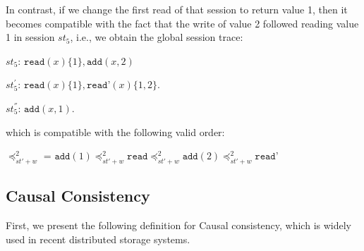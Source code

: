 \documentclass[journal, compsoc]{IEEEtran}
\begin{document}
	In contrast, if we change the first read of that session to return  value 1, then it becomes compatible with the fact that the write of value 2 followed reading value 1 in session $\mathit{st}_5$, i.e., we obtain the global session trace:
	
	$\mathit{st}_5$: $\texttt{read}(x){\{1\}},\texttt{add}(x,2)$
	
	$\mathit{st}_5^{'}$: $\texttt{read}(x){\{1\}},\texttt{read'}(x){\{1,2\}}$.
	
	$\mathit{st}_5^{''}$: $\texttt{add}(x,1)$.
	
	which is compatible with the following valid order:
	
	\noindent $\preccurlyeq_{\mathit{st'}+w}^2$ = $\texttt{add}(1) \preccurlyeq_{\mathit{st'}+w}^2 \texttt{read}
	\preccurlyeq_{\mathit{st'}+w}^2  \texttt{add}(2) \preccurlyeq_{\mathit{st'}+w}^2 \texttt{read'}$
	
	\subsection{Causal Consistency}
	
	
	First, we present the following definition for Causal consistency, which is widely used in recent distributed storage systems.
	
\end{document}
